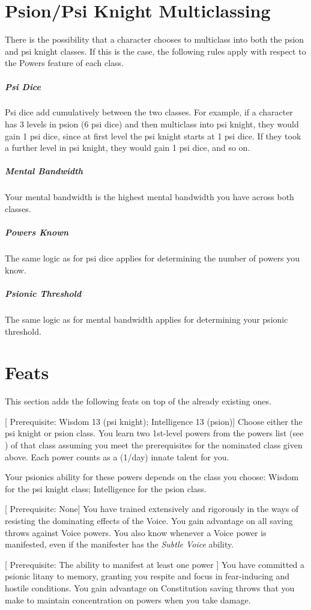 \section{Psion/Psi Knight Multiclassing}
\label{sec:psion_psi_knight_multiclassing}
There is the possibility that a character chooses to multiclass
into both the psion and psi knight classes.
If this is the case,
the following rules apply with respect to the Powers feature
of each class.
\subparagraph{Psi Dice}
    Psi dice add cumulatively between the two classes.
    For example,
    if a character has 3 levels in psion (6 psi dice)
    and then multiclass into psi knight,
    they would gain 1 psi dice,
    since at first level the psi knight starts at 1 psi dice.
    If they took a further level in psi knight,
    they would gain 1 psi dice,
    and so on.
\subparagraph{Mental Bandwidth}
    Your mental bandwidth is the highest mental bandwidth you
    have across both classes.
\subparagraph{Powers Known}
    The same logic as for psi dice applies for
    determining the number of powers you know.
\subparagraph{Psionic Threshold}
    The same logic as for mental bandwidth applies for
    determining your psionic threshold.

\section{Feats}
\label{sec:feats}
This section adds the following feats on top of the already
existing ones.

[
    Prerequisite: Wisdom 13 (psi knight); Intelligence 13 (psion)]
    Choose either the psi knight or psion class.
    You learn two 1st-level powers from the powers list
    (see )
    of that class assuming you meet the prerequisites
    for the nominated class given above.
    Each power counts as a (1/day) innate talent for you.

    Your psionics ability for these powers depends on the class
    you choose:
    Wisdom for the psi knight class; Intelligence for the psion class.

[
    Prerequisite: None]
    You have trained extensively and rigorously in the ways
    of resisting the dominating effects of the Voice.
    You gain advantage on all saving throws against
    Voice powers.
    You also know whenever a Voice power is manifested,
    even if the manifester has the \emph{Subtle Voice} ability.

[
    Prerequisite: The ability to manifest at least one power
]
You have committed a psionic litany to memory, granting you respite
and focus in fear-inducing and hostile conditions.
You gain advantage on Constitution saving throws that you make
to maintain concentration on powers when you take damage.

